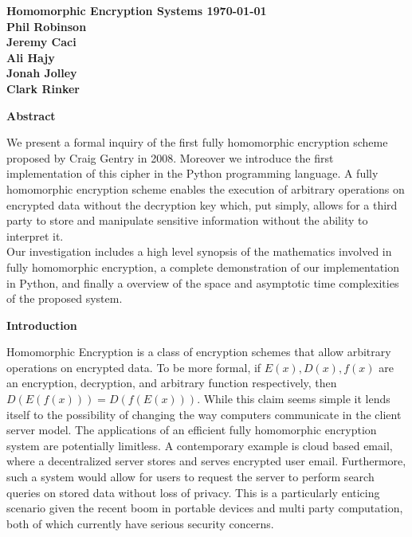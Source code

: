 \documentclass[11pt]{article}
\date{\today}
\begin{document}
\textbf{Homomorphic Encryption Systems \hfill \today\ \\
Phil Robinson \\
Jeremy Caci \\
Ali Hajy \\
Jonah Jolley \\
Clark Rinker}
\begin{center}
\textbf{Abstract}
\end{center}
\hspace{1em}We present a formal inquiry of the first fully homomorphic encryption scheme proposed by Craig Gentry in 2008. Moreover we introduce the first implementation of this cipher in the Python programming language. A fully homomorphic encryption scheme enables the execution of arbitrary operations on encrypted data without the decryption key which, put simply, allows for a third party to  store and manipulate sensitive information without the ability to interpret it.\\ 

\hspace{1em}Our investigation includes a high level synopsis of the mathematics involved in fully homomorphic encryption, a complete demonstration of our implementation in Python, and finally a overview of the space and asymptotic time complexities of the proposed system. 



\begin{center}
\textbf{Introduction}
\end{center}

	Homomorphic Encryption is a class of encryption schemes that allow arbitrary operations on encrypted data. To be more formal, if $E(x),D(x),f(x)$ are an encryption, decryption, and arbitrary function respectively, then $D(E(f(x)))=D(f(E(x)))$. While this claim seems simple it lends itself to the possibility of changing the way computers communicate in the client server model. The applications of an efficient fully homomorphic encryption system are potentially limitless. A contemporary example is cloud based email, where a decentralized server stores and serves encrypted user email. Furthermore, such a system would allow for users to request the server to perform search queries on stored data without loss of privacy. This is a particularly enticing scenario given the recent boom in portable devices and multi party computation, both of which currently have serious security concerns. \\
\end{document}
